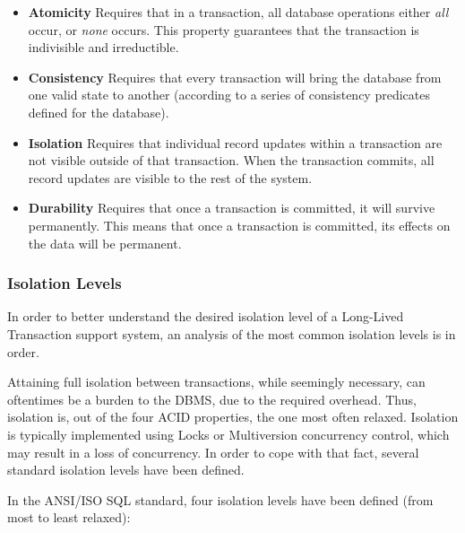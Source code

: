 \documentclass{llncs}
\begin{document}
\begin{itemize}

\item {\bf Atomicity} Requires that in a transaction, all database
  operations either {\it all} occur, or {\it none} occurs. This
  property guarantees that the transaction is indivisible and
  irreductible.

\item {\bf Consistency} Requires that every transaction will bring the
  database from one valid state to another (according to a series of
  consistency predicates defined for the database).

\item {\bf Isolation} Requires that individual record updates within a
  transaction are not visible outside of that transaction. When the
  transaction commits, all record updates are visible to the rest of
  the system.

\item {\bf Durability} Requires that once a transaction is committed,
  it will survive permanently. This means that once a transaction is
  committed, its effects on the data will be permanent.

\end{itemize}

\subsubsection{Isolation Levels}
\label{sec:isolation}

In order to better understand the desired isolation level of a
Long-Lived Transaction support system, an analysis of the most common
isolation levels is in order.

Attaining full isolation between transactions, while seemingly
necessary, can oftentimes be a burden to the DBMS, due to the required
overhead. Thus, isolation is, out of the four ACID properties, the one
most often relaxed. Isolation is typically implemented using Locks or
Multiversion concurrency control, which may result in a loss of
concurrency. In order to cope with that fact, several standard
isolation levels have been defined.

In the ANSI/ISO SQL standard\cite{melton1992ansi}, four isolation
levels have been defined (from most to least relaxed):
\end{document}
